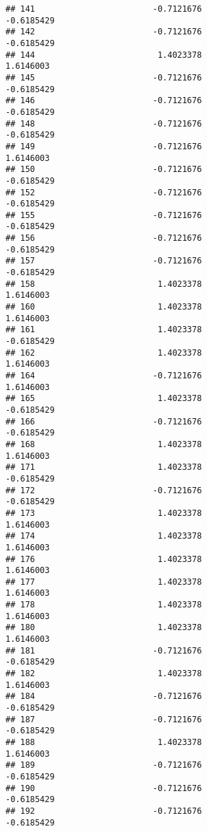 \documentclass[
]{article}
\begin{document}
\begin{verbatim}
## 141                        -0.7121676                       -0.6185429
## 142                        -0.7121676                       -0.6185429
## 144                         1.4023378                        1.6146003
## 145                        -0.7121676                       -0.6185429
## 146                        -0.7121676                       -0.6185429
## 148                        -0.7121676                       -0.6185429
## 149                        -0.7121676                        1.6146003
## 150                        -0.7121676                       -0.6185429
## 152                        -0.7121676                       -0.6185429
## 155                        -0.7121676                       -0.6185429
## 156                        -0.7121676                       -0.6185429
## 157                        -0.7121676                       -0.6185429
## 158                         1.4023378                        1.6146003
## 160                         1.4023378                        1.6146003
## 161                         1.4023378                       -0.6185429
## 162                         1.4023378                        1.6146003
## 164                        -0.7121676                        1.6146003
## 165                         1.4023378                       -0.6185429
## 166                        -0.7121676                       -0.6185429
## 168                         1.4023378                        1.6146003
## 171                         1.4023378                       -0.6185429
## 172                        -0.7121676                       -0.6185429
## 173                         1.4023378                        1.6146003
## 174                         1.4023378                        1.6146003
## 176                         1.4023378                        1.6146003
## 177                         1.4023378                        1.6146003
## 178                         1.4023378                        1.6146003
## 180                         1.4023378                        1.6146003
## 181                        -0.7121676                       -0.6185429
## 182                         1.4023378                        1.6146003
## 184                        -0.7121676                       -0.6185429
## 187                        -0.7121676                       -0.6185429
## 188                         1.4023378                        1.6146003
## 189                        -0.7121676                       -0.6185429
## 190                        -0.7121676                       -0.6185429
## 192                        -0.7121676                       -0.6185429

\end{verbatim}
\end{document}
